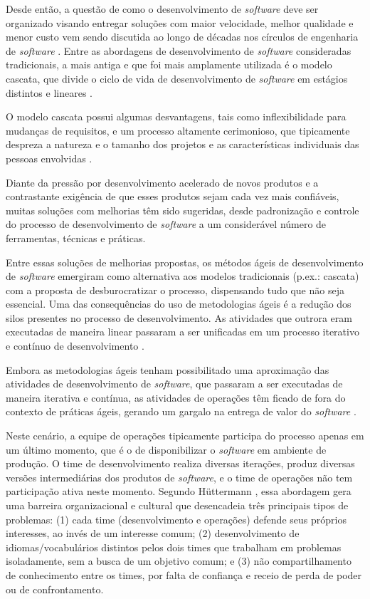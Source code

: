 Desde então, a questão de como o desenvolvimento de \textit{software} deve ser
organizado visando entregar soluções com maior velocidade, melhor qualidade e
menor custo vem sendo discutida ao longo de décadas nos círculos de engenharia
de \textit{software} \cite{empirical_studies_agile}. Entre as abordagens de
desenvolvimento de \textit{software} consideradas tradicionais, a mais antiga e
que foi mais amplamente utilizada é o modelo cascata, que divide o ciclo de
vida de desenvolvimento de \textit{software} em estágios distintos e lineares
\cite{software_quality_agile}.

O modelo cascata possui algumas desvantagens, tais como inflexibilidade para
mudanças de requisitos, e um processo altamente cerimonioso, que tipicamente
despreza a natureza e o tamanho dos projetos e as características individuais
das pessoas envolvidas \cite{software_quality_agile}.

Diante da pressão por desenvolvimento acelerado de novos produtos e a
contrastante exigência de que esses produtos sejam cada vez mais confiáveis,
muitas soluções com melhorias têm sido sugeridas, desde padronização e controle
do processo de desenvolvimento de \textit{software} a um considerável número
de ferramentas, técnicas e práticas.

Entre essas soluções de melhorias propostas, os métodos ágeis de
desenvolvimento de \textit{software} emergiram como
alternativa aos modelos tradicionais (p.ex.: cascata) com a proposta de
desburocratizar o processo, dispensando tudo que não seja essencial. Uma das
consequências do uso de metodologias ágeis é a redução dos silos presentes no
processo de desenvolvimento. As atividades que outrora eram executadas de
maneira linear passaram a ser unificadas em um processo iterativo e contínuo
de desenvolvimento \cite{a_decade_of_agile}.

Embora as metodologias ágeis tenham possibilitado uma aproximação das
atividades de desenvolvimento de \textit{software}, que passaram a ser
executadas de maneira iterativa e contínua, as atividades de operações têm
ficado de fora do contexto de práticas ágeis, gerando um gargalo na entrega
de valor do \textit{software} \cite{understanding_devops}.

Neste cenário, a equipe de operações tipicamente participa do processo
apenas em um último momento, que é o de disponibilizar o
\textit{software} em ambiente de produção. O time de desenvolvimento realiza
diversas iterações, produz diversas versões intermediárias dos produtos de
\textit{software}, e o time de operações não tem participação ativa neste
momento. Segundo H\"uttermann
\cite{devops_for_developers}, essa abordagem gera uma barreira organizacional
e cultural que desencadeia três principais tipos de problemas: (1) cada time
(desenvolvimento e operações) defende seus próprios interesses, ao invés de
um interesse comum; (2) desenvolvimento de idiomas/vocabulários distintos pelos
dois times que trabalham em problemas isoladamente, sem a busca de um objetivo
comum; e (3) não compartilhamento de conhecimento entre os times, por falta
de confiança e receio de perda de poder ou de confrontamento.


